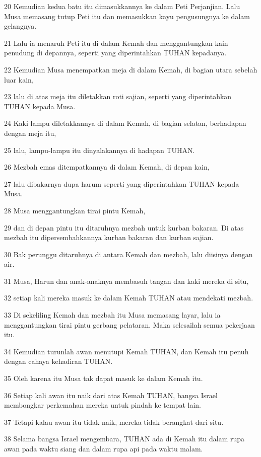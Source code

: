 \par 20 Kemudian kedua batu itu dimasukkannya ke dalam Peti Perjanjian. Lalu Musa memasang tutup Peti itu dan memasukkan kayu pengusungnya ke dalam gelangnya.
\par 21 Lalu ia menaruh Peti itu di dalam Kemah dan menggantungkan kain penudung di depannya, seperti yang diperintahkan TUHAN kepadanya.
\par 22 Kemudian Musa menempatkan meja di dalam Kemah, di bagian utara sebelah luar kain,
\par 23 lalu di atas meja itu diletakkan roti sajian, seperti yang diperintahkan TUHAN kepada Musa.
\par 24 Kaki lampu diletakkannya di dalam Kemah, di bagian selatan, berhadapan dengan meja itu,
\par 25 lalu, lampu-lampu itu dinyalakannya di hadapan TUHAN.
\par 26 Mezbah emas ditempatkannya di dalam Kemah, di depan kain,
\par 27 lalu dibakarnya dupa harum seperti yang diperintahkan TUHAN kepada Musa.
\par 28 Musa menggantungkan tirai pintu Kemah,
\par 29 dan di depan pintu itu ditaruhnya mezbah untuk kurban bakaran. Di atas mezbah itu dipersembahkannya kurban bakaran dan kurban sajian.
\par 30 Bak perunggu ditaruhnya di antara Kemah dan mezbah, lalu diisinya dengan air.
\par 31 Musa, Harun dan anak-anaknya membasuh tangan dan kaki mereka di situ,
\par 32 setiap kali mereka masuk ke dalam Kemah TUHAN atau mendekati mezbah.
\par 33 Di sekeliling Kemah dan mezbah itu Musa memasang layar, lalu ia menggantungkan tirai pintu gerbang pelataran. Maka selesailah semua pekerjaan itu.
\par 34 Kemudian turunlah awan menutupi Kemah TUHAN, dan Kemah itu penuh dengan cahaya kehadiran TUHAN.
\par 35 Oleh karena itu Musa tak dapat masuk ke dalam Kemah itu.
\par 36 Setiap kali awan itu naik dari atas Kemah TUHAN, bangsa Israel membongkar perkemahan mereka untuk pindah ke tempat lain.
\par 37 Tetapi kalau awan itu tidak naik, mereka tidak berangkat dari situ.
\par 38 Selama bangsa Israel mengembara, TUHAN ada di Kemah itu dalam rupa awan pada waktu siang dan dalam rupa api pada waktu malam.


